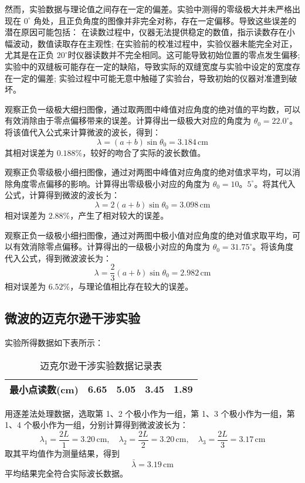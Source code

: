 \documentclass[UTF-8,twoside,cs4size]{ctexart}
\begin{document}
然而，实验数据与理论值之间存在一定的偏差。实验中测得的零级极大并未严格出现在 $0^\circ$ 角处，且正负角度的图像并非完全对称，存在一定偏移。导致这些误差的潜在原因可能包括：
在读数过程中，仪器无法提供稳定的数值，指示读数存在小幅波动，数值读取存在主观性;
在实验前的校准过程中，实验仪器未能完全对正，尤其是在正负 $20^\circ$时仪器读数并不完全相同。这可能导致初始位置的零点发生偏移;
实验中的双缝板可能存在一定的缺陷，导致实际的双缝宽度与实验中设定的宽度存在一定的偏差;
实验过程中可能无意中触碰了实验台，导致初始的仪器对准遭到破坏。 

观察正负一级极大细扫图像，通过取两图中峰值对应角度的绝对值的平均数，可以有效消除由于零点偏移带来的误差。计算得出一级极大对应的角度为 $\theta_0 = 22.0^{\circ}$。将该值代入公式来计算微波的波长，得到：
\[
\lambda = (a + b) \sin \theta_0 = 3.184\, \mathrm{cm}
\]
其相对误差为 $0.188\%$，较好的吻合了实际的波长数值。

观察正负零级极小细扫图像，通过对两图中峰值对应角度的绝对值求平均，可以消除角度零点偏移的影响。计算得出零级极小对应的角度为 $\theta_0 = 10。5^{\circ}$。将其代入公式，计算得到微波的波长为：
\[
\lambda = 2(a + b) \sin \theta_0 = 3.098\, \mathrm{cm}
\]
相对误差为 $2.88\%$，产生了相对较大的误差。

观察正负一级极小细扫图像，通过对两图中极小值对应角度的绝对值求取平均，可以有效消除零点偏移。计算得出的一级极小对应的角度为 $\theta_0 = 31.75^\circ$。将该角度代入公式，得到微波波长为：
\[
\lambda = \frac{2}{3}(a + b) \sin \theta_0 = 2.982\, \mathrm{cm}
\]
相对误差为 $6.52\%$，与理论值相比存在较大的误差。

\subsection{微波的迈克尔逊干涉实验}
实验所得数据如下表所示：
\begin{table}[!h]
    \centering
    \begin{tabularx}{\textwidth}{|c|Y|Y|Y|Y|}
        \hline
        最小点读数(cm) & 6.65 & 5.05 & 3.45 & 1.89\\
        \hline
    \end{tabularx}
    \caption{迈克尔逊干涉实验数据记录表}
\end{table}
用逐差法处理数据，选取第 1、2 个极小作为一组，第 1、3 个极小作为一组，第 1、4 个极小作为一组，分别计算得到微波波长为：
\[
\lambda_1 = \frac{2L}{1} = 3.20\,\mathrm{cm}, \quad \lambda_2 = \frac{2L}{2} = 3.20\,\mathrm{cm}, \quad \lambda_3 = \frac{2L}{3} = 3.17\,\mathrm{cm}
\]
取其平均值作为测量结果，得到
\[
\bar{\lambda} = 3.19\,\mathrm{cm}
\]
平均结果完全符合实际波长数据。
\end{document}
